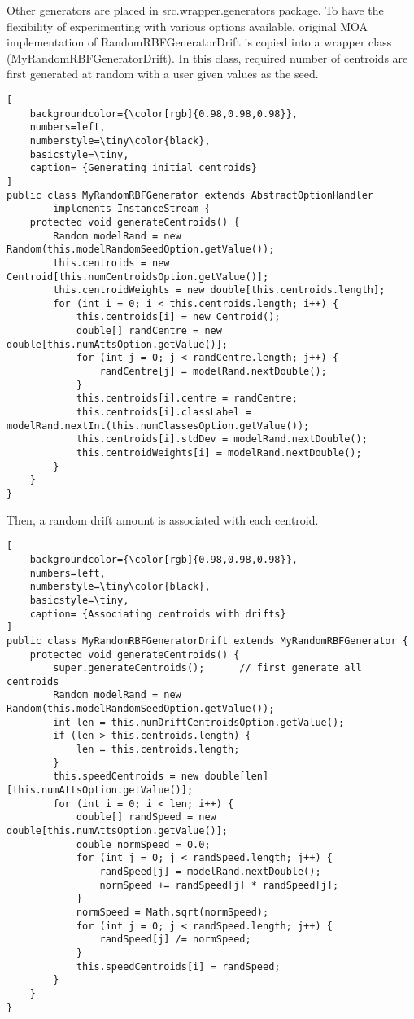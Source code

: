 Other generators are placed in src.wrapper.generators package.  To have the flexibility of experimenting with various options available, original MOA implementation of RandomRBFGeneratorDrift is copied into a wrapper class (MyRandomRBFGeneratorDrift). In this class, required number of centroids are first generated at random with a user given values as the seed.
\begin{lstlisting}[
    backgroundcolor={\color[rgb]{0.98,0.98,0.98}},
    numbers=left,
    numberstyle=\tiny\color{black},
    basicstyle=\tiny,
    caption= {Generating initial centroids}
]
public class MyRandomRBFGenerator extends AbstractOptionHandler 
        implements InstanceStream {
    protected void generateCentroids() {
        Random modelRand = new Random(this.modelRandomSeedOption.getValue());
        this.centroids = new Centroid[this.numCentroidsOption.getValue()];
        this.centroidWeights = new double[this.centroids.length];
        for (int i = 0; i < this.centroids.length; i++) {
            this.centroids[i] = new Centroid();
            double[] randCentre = new double[this.numAttsOption.getValue()];
            for (int j = 0; j < randCentre.length; j++) {
                randCentre[j] = modelRand.nextDouble();
            }
            this.centroids[i].centre = randCentre;
            this.centroids[i].classLabel = modelRand.nextInt(this.numClassesOption.getValue());
            this.centroids[i].stdDev = modelRand.nextDouble();
            this.centroidWeights[i] = modelRand.nextDouble();
        }
    }
}
\end{lstlisting}
Then, a random drift amount is associated with each centroid.
\begin{lstlisting}[
    backgroundcolor={\color[rgb]{0.98,0.98,0.98}},
    numbers=left,
    numberstyle=\tiny\color{black},
    basicstyle=\tiny,
    caption= {Associating centroids with drifts}
]
public class MyRandomRBFGeneratorDrift extends MyRandomRBFGenerator {
    protected void generateCentroids() {
        super.generateCentroids();		// first generate all centroids
        Random modelRand = new Random(this.modelRandomSeedOption.getValue());
        int len = this.numDriftCentroidsOption.getValue();
        if (len > this.centroids.length) {
            len = this.centroids.length;
        }
        this.speedCentroids = new double[len][this.numAttsOption.getValue()];
        for (int i = 0; i < len; i++) {
            double[] randSpeed = new double[this.numAttsOption.getValue()];
            double normSpeed = 0.0;
            for (int j = 0; j < randSpeed.length; j++) {
                randSpeed[j] = modelRand.nextDouble();
                normSpeed += randSpeed[j] * randSpeed[j];
            }
            normSpeed = Math.sqrt(normSpeed);
            for (int j = 0; j < randSpeed.length; j++) {
                randSpeed[j] /= normSpeed;
            }
            this.speedCentroids[i] = randSpeed;
        }
    }
}
\end{lstlisting}
